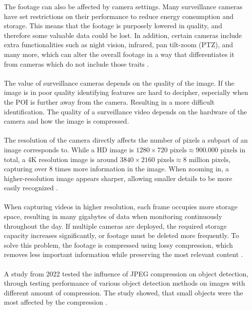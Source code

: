 \noindent The footage can also be affected by camera settings. Many surveillance cameras have set restrictions on their performance to reduce energy consumption and storage. This means that the footage is purposely lowered in quality, and therefore some valuable data could be lost. In addition, certain cameras include extra functionalities such as night vision, infrared, pan tilt-zoom (PTZ), and many more, which can alter the overall footage in a way that differentiates it from cameras which do not include those traits \cite{ecamnightvisionCCTV2025, ucocare2024SurvilanceCameraFunction}. 
\\\\
The value of surveillance cameras depends on the quality of the image. If the image is in poor quality identifying features are hard to decipher, especially when the \acs{POI} is further away from the camera. Resulting in a more difficult identification. The quality of a surveillance video depends on the hardware of the camera and how the image is compressed. 
\\\\
The resolution of the camera directly affects the number of pixels a subpart of an image corresponds to. While a \acs{HD} image is \(1280\times720 \text{ pixels} \approx 900.000 \text{ pixels}\) in total, a 4K resolution image is around \(3840\times 2160 \text{ pixels} \approx 8 \text{ million pixels}\), capturing over 8 times more information in the image. When zooming in, a higher-resolution image appears sharper, allowing smaller details to be more easily recognized \cite{image_resolution}.
\\\\
When capturing videos in higher resolution, each frame occupies more storage space, resulting in many gigabytes of data when monitoring continuously throughout the day. If multiple cameras are deployed, the required storage capacity increases significantly, or footage must be deleted more frequently. To solve this problem, the footage is compressed using lossy compression, which removes less important information while preserving the most relevant content \cite{compression_challenge}.
\\\\
A study from 2022 tested the influence of JPEG compression on object detection, through testing performance of various object detection methods on images with different amount of compression. The study showed, that small objects were the most affected by the compression \cite{image_compression_study}.


